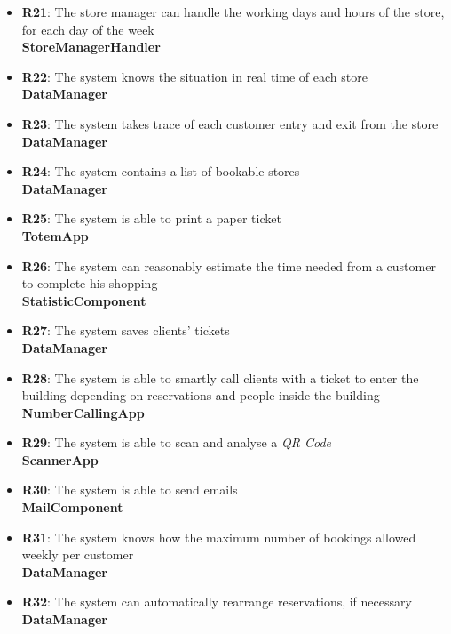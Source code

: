 \documentclass{article}
\begin{document}
\begin{itemize}
\item {\bfseries R21}: The store manager can handle the working days and hours of the store, for each day of the week \\
\textbf{StoreManagerHandler}

\item {\bfseries R22}: The system knows the situation in real time of each store \\
\textbf{DataManager}

\item {\bfseries R23}: The system takes trace of each customer entry and exit from the store \\
\textbf{DataManager}

\item {\bfseries R24}: The system contains a list of bookable stores \\
\textbf{DataManager}

\item {\bfseries R25}: The system is able to print a paper ticket \\
\textbf{TotemApp}

\item {\bfseries R26}: The system can reasonably estimate the time needed from a customer to complete his shopping \\
\textbf{StatisticComponent}

\item {\bfseries R27}: The system saves clients' tickets \\
\textbf{DataManager}

\item {\bfseries R28}: The system is able to smartly call clients with a ticket to enter the building depending on reservations and people inside the building \\
\textbf{NumberCallingApp}

\item {\bfseries R29}: The system is able to scan and analyse a \emph{QR Code} \\
\textbf{ScannerApp}

\item{\bfseries R30}: The system is able to send emails \\
\textbf{MailComponent}

\item {\bfseries R31}: The system knows how the maximum number of bookings allowed weekly per customer \\
\textbf{DataManager}

\item{\bfseries R32}: The system can automatically rearrange reservations, if necessary \\
\textbf{DataManager}

\end{itemize}
\end{document}
